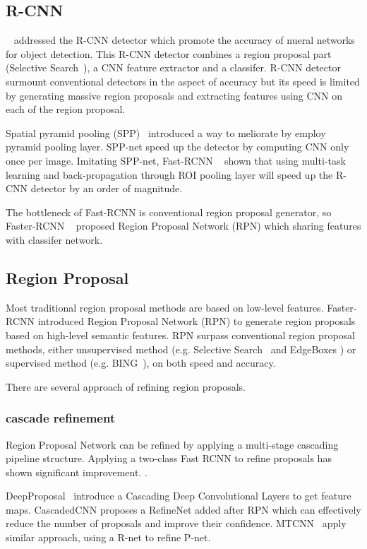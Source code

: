 \documentclass[10pt,twocolumn,letterpaper]{article}
\begin{document}
\subsection{R-CNN}
~\cite{RCNN} addressed the R-CNN detector which promote the accuracy of nueral networks for object detection. This R-CNN detector combines a region proposal part (Selective Search~\cite{SelectiveSearch}), a CNN feature extractor and a classifer. R-CNN detector surmount conventional detectors in the aspect of accuracy but its speed is limited by generating massive region proposals and extracting features using CNN on each of the region proposal. 

Spatial pyramid pooling (SPP)~\cite{SPP} introduced a way to meliorate by employ pyramid pooling layer. SPP-net speed up the detector by computing CNN only once per image. Imitating SPP-net, Fast-RCNN ~\cite{fastRCNN} shown that using multi-task learning and back-propagation through ROI pooling layer will speed up the R-CNN detector by an order of magnitude. 

The bottleneck of Fast-RCNN is conventional region proposal generator, so Faster-RCNN ~\cite{fasterRCNN} proposed Region Proposal Network (RPN) which sharing features with classifer network.


\subsection{Region Proposal}
Most traditional region proposal methods are based on low-level features. Faster-RCNN introduced Region Proposal Network (RPN) to generate region proposals based on high-level semantic features. RPN surpass conventional region proposal methods, either unsupervised method (e.g. Selective Search~\cite{SelectiveSearch} and EdgeBoxes \cite{EdgeBoxes}) or supervised method (e.g. BING~\cite{BING}), on both speed and accuracy.

There are several approach of refining region proposals.

\subsubsection{cascade refinement}
Region Proposal Network can be refined by applying a multi-stage cascading pipeline structure. Applying a two-class Fast RCNN to refine proposals has shown significant improvement. \cite{CRAFT} \cite{CraftingGBD} \cite{DeepBox}.  

DeepProposal~\cite{DeepProposal} introduce a Cascading Deep Convolutional Layers to get feature maps. CascadedCNN \cite{Cascadedcnn} proposes a RefineNet added after RPN which can effectively reduce the number of proposals and improve their confidence. MTCNN~\cite{MTCNN} apply similar approach, using a R-net to refine P-net.
\end{document}

